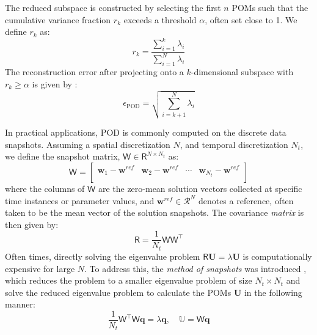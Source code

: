 \documentclass[11pt]{article}
\renewcommand{\vec}[1]{\mathbf{#1}}
\newcommand{\mat}[1]{\mathsf{#1}}
\begin{document}
    The reduced subspace is constructed by selecting the first $n$ POMs such that the cumulative variance fraction $r_k$ exceeds a threshold $\alpha$, often set close to 1. We define $r_k$ as:
    \begin{equation}
    r_k = \frac{\sum_{i=1}^k \lambda_i}{\sum_{i=1}^N \lambda_i}
    \label{eq:mode_sel}
    \end{equation}
    The reconstruction error after projecting onto a $k$-dimensional subspace with $r_k \geq \alpha$ is given by \cite{bhattacharyya2020energy}:
    \begin{equation}
    \epsilon_{\text{POD}} = \sqrt{\sum_{i=k+1}^N \lambda_i}
    \end{equation}


    In practical applications, POD is commonly computed on the discrete data snapshots.
    Assuming a spatial discretization $N$, and temporal discretization $N_t$, we define the snapshot matrix, \(\mat{W}\in\mathsf{R}^{N\times N_t}\) as:
    \begin{equation}
    	\mat{W}=\left[\begin{array}{cccc}
    	\mathbf{w}_{1} - \mathbf{w}^{ref} & \mathbf{w}_{2} - \mathbf{w}^{ref}& \cdots & \mathbf{w}_{N_t} - \mathbf{w}^{ref}\\
    	\end{array}\right]
    \label{eq:data_W}
    \end{equation}
    where the columns of $\mat{W}$ are the zero-mean solution vectors collected at specific time instances or parameter values, and $\mathbf{w}^{ref}\in\mathcal{R}^{N}$ denotes a reference, often taken to be the mean vector of the solution snapshots.
    The covariance \textit{matrix} is then given by:
    \begin{equation}
    \mat{R} = \frac{1}{N_t}\mat{W}\mat{W}^\top
    \label{eq:cor_mat}
    \end{equation}
    Often times, directly solving the eigenvalue problem \(\mat{R}\vec{U} = \lambda\vec{U}\) is computationally expensive for large \(N\).
    To address this, the \textit{method of snapshots} was introduced \cite{sirovich1987low-dimensional}, which reduces the problem to a smaller eigenvalue problem of size \(N_t \times N_t\) and solve the reduced eigenvalue problem to calculate the POMs $\vec{U}$ in the following manner:
    \begin{equation}
    \frac{1}{N_t}\mat{W}^\top\mat{W}\vec{q} = \lambda\vec{q}, \quad \mathbb{U} = \mat{W}\vec{q}
    \end{equation}
\end{document}
